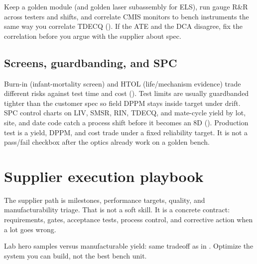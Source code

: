 Keep a golden module (and golden laser subassembly for ELS), run gauge R\&R
across testers and shifts, and correlate CMIS monitors to bench instruments the
same way you correlate TDECQ (). If the ATE and the DCA disagree,
fix the correlation before you argue with the supplier about spec.

\subsection{Screens, guardbanding, and SPC}

Burn-in (infant-mortality screen) and HTOL (life/mechanism evidence) trade
different risks against test time and cost
(). Test limits are usually guardbanded
tighter than the customer spec so field DPPM stays inside target under drift.
SPC control charts on LIV, SMSR, RIN, TDECQ, and mate-cycle yield by lot, site,
and date code catch a process shift before it becomes an 8D ().
Production test is a yield, DPPM, and cost trade under a fixed reliability target.
It is not a pass/fail checkbox after the optics already work on a golden bench.

\section{Supplier execution playbook}
\label{sec:supplier-exec}

The supplier path is milestones, performance targets, quality, and
manufacturability triage. That is not a soft skill. It is a concrete contract:
requirements, gates, acceptance tests, process control, and corrective action when
a lot goes wrong.




Lab hero samples versus manufacturable yield: same tradeoff as in
. Optimize the system you can build, not the best bench unit.

